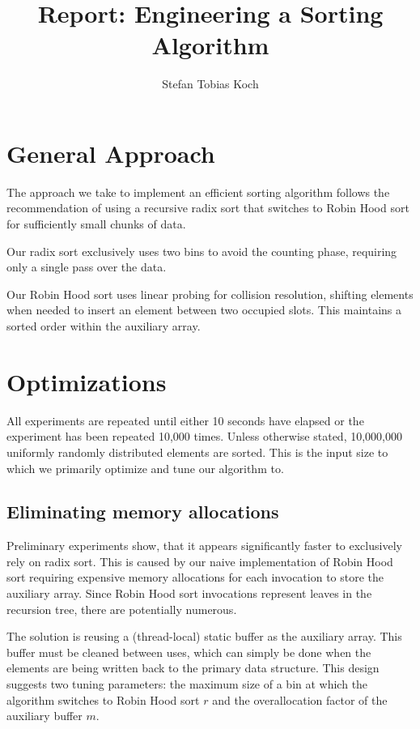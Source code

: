 \documentclass[a4paper,UKenglish,cleveref, autoref, thm-restate]{template/lipics-v2021}
\title{Report: Engineering a Sorting Algorithm}
\author{Stefan Tobias Koch}{Karlsruhe Institute of Technology, Germany}{stefan.koch@student.kit.edu}{}{}
\begin{document}
	
	\maketitle
	
	\section{General Approach}
	
	The approach we take to implement an efficient sorting algorithm follows the recommendation of using a recursive radix sort that switches to Robin Hood sort for sufficiently small chunks of data.
	
	Our radix sort exclusively uses two bins to avoid the counting phase, requiring only a single pass over the data.
	
	Our Robin Hood sort uses linear probing for collision resolution, shifting elements when needed to insert an element between two occupied slots.
	This maintains a sorted order within the auxiliary array.
	
	\section{Optimizations}
	
	All experiments are repeated until either 10 seconds have elapsed or the experiment has been repeated 10,000 times.
	Unless otherwise stated, 10,000,000 uniformly randomly distributed elements are sorted.
	This is the input size to which we primarily optimize and tune our algorithm to.
	
	\subsection{Eliminating memory allocations}
	
	Preliminary experiments show, that it appears significantly faster to exclusively rely on radix sort.
	This is caused by our naive implementation of Robin Hood sort requiring expensive memory allocations for each invocation to store the auxiliary array. Since Robin Hood sort invocations represent leaves in the recursion tree, there are potentially numerous.
	
	The solution is reusing a (thread-local) static buffer as the auxiliary array.
	This buffer must be cleaned between uses, which can simply be done when the elements are being written back to the primary data structure.
	This design suggests two tuning parameters: the maximum size of a bin at which the algorithm switches to Robin Hood sort $r$ and the overallocation factor of the auxiliary buffer $m$.
	
\end{document}
